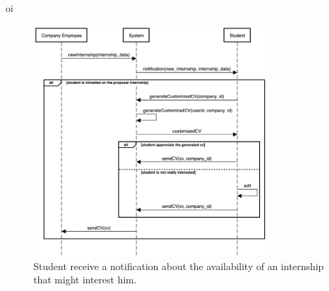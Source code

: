 oi
    \begin{figure}[H]
        \centering
        \includegraphics[width=0.8\textwidth]{RASD/Assets/SequenceDiagrams/5-student-receives-a-notification.png}
        \caption{Student receive a notification about the availability of an internship that might interest him.}
        \label{fig:Student receive a notification about the availability of an internship that might interest him}
    \end{figure}

